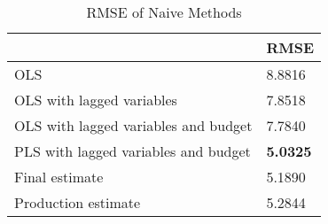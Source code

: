 \begin{table}[h!]
\centering
\caption{RMSE of Naive Methods}
\label{naive_rmse}
\begin{tabular}{ll}
\toprule
 & RMSE \\
\midrule
OLS & 8.8816 \\
OLS with lagged variables & 7.8518 \\
OLS with lagged variables and budget & 7.7840 \\
PLS with lagged variables and budget & \textbf{5.0325} \\
Final estimate & 5.1890 \\
Production estimate & 5.2844 \\
\bottomrule
\end{tabular}
\end{table}
